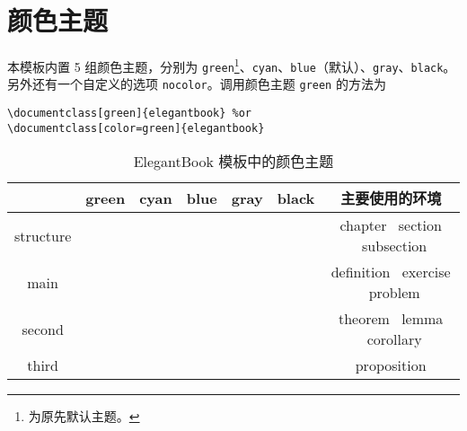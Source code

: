 \documentclass[cn,11pt]{elegantbook}
\begin{document}
\section{颜色主题}
本模板内置 5 组颜色主题，分别为 \textcolor{structure1}{\lstinline{green}}\footnote{为原先默认主题。}、\textcolor{structure2}{\lstinline{cyan}}、\textcolor{structure3}{\lstinline{blue}}（默认）、\textcolor{structure4}{\lstinline{gray}}、\textcolor{structure5}{\lstinline{black}}。另外还有一个自定义的选项  \lstinline{nocolor}。调用颜色主题 \lstinline{green} 的方法为 
\begin{lstlisting}
\documentclass[green]{elegantbook} %or
\documentclass[color=green]{elegantbook}
\end{lstlisting}

\begin{table}[htbp]
\caption{ElegantBook 模板中的颜色主题\label{tab:color thm}}
\centering
\begin{tabular}{ccccccc}
\toprule
	        & \textcolor{structure1}{green} 
	        & \textcolor{structure2}{cyan} 
	        & \textcolor{structure3}{blue}
	        & \textcolor{structure4}{gray} 
	        & \textcolor{structure5}{black} 
	        & 主要使用的环境\\
\midrule
structure & \makecell{{\color{structure1}\rule{1cm}{1cm}}}
				& \makecell{{\color{structure2}\rule{1cm}{1cm}}}
				& \makecell{{\color{structure3}\rule{1cm}{1cm}}} 
				& \makecell{{\color{structure4}\rule{1cm}{1cm}}} 
				& \makecell{{\color{structure5}\rule{1cm}{1cm}}} 
				& chapter \ section \ subsection \\

main      & \makecell{{\color{main1}\rule{1cm}{1cm}}}
				& \makecell{{\color{main2}\rule{1cm}{1cm}}}
				& \makecell{{\color{main3}\rule{1cm}{1cm}}}
				& \makecell{{\color{main4}\rule{1cm}{1cm}}}
				& \makecell{{\color{main5}\rule{1cm}{1cm}}}
				& definition \ exercise \ problem \\

second    & \makecell{{\color{second1}\rule{1cm}{1cm}}}
				& \makecell{{\color{second2}\rule{1cm}{1cm}}}
				& \makecell{{\color{second3}\rule{1cm}{1cm}}}
				& \makecell{{\color{second4}\rule{1cm}{1cm}}}
				& \makecell{{\color{second5}\rule{1cm}{1cm}}}
				& theorem \ lemma \ corollary\\

third     & \makecell{{\color{third1}\rule{1cm}{1cm}}}
				& \makecell{{\color{third2}\rule{1cm}{1cm}}}
				& \makecell{{\color{third3}\rule{1cm}{1cm}}}
				& \makecell{{\color{third4}\rule{1cm}{1cm}}}
				& \makecell{{\color{third5}\rule{1cm}{1cm}}}
				& proposition\\
\bottomrule
\end{tabular}
\end{table}
\end{document}

